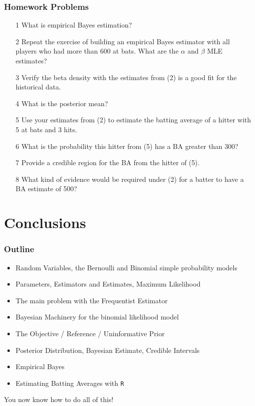 \documentclass[slides]{beamer} %
\begin{document}
\begin{frame}
	\frametitle{Homework Problems}
\begin{enumerate}
\item[1] What is empirical Bayes estimation?
\item[2] Repeat the exercise of building an empirical Bayes estimator with all players who had more than 600 at bats. What are the $\alpha$ and $\beta$ MLE estimates?
\item[3] Verify the beta density with the estimates from (2) is a good fit for the historical data.
\item[4] What is the posterior mean?
\item[5] Use your estimates from (2) to estimate the batting average of a hitter with 5 at bats and 3 hits.
\item[6] What is the probability this hitter from (5) has a BA greater than 300?
\item[7] Provide a credible region for the BA from the hitter of (5).
\item[8] What kind of evidence would be required under (2) for a batter to have a BA estimate of 500?
\end{enumerate}
\end{frame}	

\section{Conclusions}

\begin{frame}
	\frametitle{Outline}

\begin{itemize}
\item Random Variables, the Bernoulli and Binomial simple probability models 
\item Parameters, Estimators and Estimates, Maximum Likelihood 
\item The main problem with the Frequentist Estimator
\item Bayesian Machinery for the binomial likelihood model
\item The Objective / Reference / Uninformative Prior
\item Posterior Distribution, Bayesian Estimate, Credible Intervals
\item Empirical Bayes
\item Estimating Batting Averages with \texttt{R}
\end{itemize}\pause 

You now know how to do all of this!
\end{frame}
\end{document}
